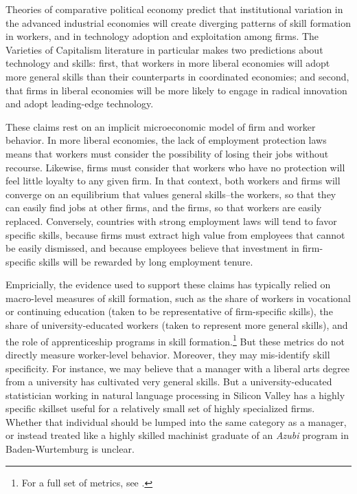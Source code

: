 \documentclass[11pt]{article}
\begin{document}
Theories of comparative political economy predict that institutional
variation in the advanced industrial economies will create diverging
patterns of skill formation in workers, and in technology adoption and
exploitation among firms. The Varieties of Capitalism literature in
particular \citep{Hall:2001} makes two predictions about technology
and skills: first, that workers in more liberal economies
will adopt more general skills than their counterparts in coordinated
economies; and second, that firms in liberal economies will be more
likely to engage in radical innovation and adopt leading-edge
technology. 

These claims rest on an implicit microeconomic model of firm and
worker behavior. In more liberal economies, the lack of employment
protection laws means that workers must consider the possibility of
losing their jobs without recourse. Likewise, firms must consider that
workers who have no protection will feel little loyalty to any given
firm. In that context, both workers and firms will converge on an
equilibrium that values general skills--the workers, so that they can
easily find jobs at other firms, and the firms, so that workers are
easily replaced. Conversely, countries with strong employment laws
will tend to favor specific skills, because firms must extract high
value from employees that cannot be easily dismissed, and because
employees believe that investment in firm-specific skills will be
rewarded by long employment tenure. 

Empricially, the evidence used to support these claims has typically
relied on macro-level measures of skill formation, such as the share
of workers in vocational or continuing education (taken to be
representative of firm-specific skills), the share of
university-educated workers (taken to represent more general skills),
and the role of apprenticeship programs in skill formation.\footnote{For a full set of metrics, see
  \cite{hall2009varieties}.} But these metrics do not directly measure
worker-level behavior. Moreover, they may mis-identify skill
specificity. For instance, we may believe that a manager with a
liberal arts degree from a university has cultivated very general
skills. But a university-educated statistician working in natural
language processing in Silicon Valley has a highly specific skillset
useful for a relatively small set of highly specialized firms. Whether
that individual should be lumped into the same category as a manager,
or instead treated like a highly skilled machinist graduate of an
\textit{Azubi} program in Baden-Wurtemburg is unclear. 
\end{document}
